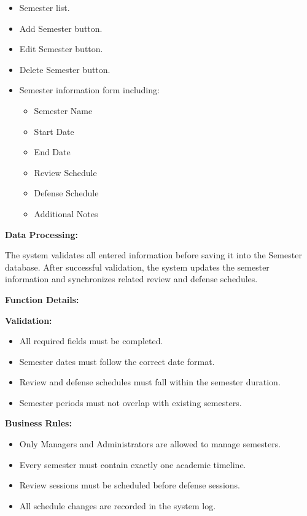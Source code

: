 \begin{itemize}
    \item Semester list.
    \item Add Semester button.
    \item Edit Semester button.
    \item Delete Semester button.
    \item Semester information form including:
    \begin{itemize}
        \item Semester Name
        \item Start Date
        \item End Date
        \item Review Schedule
        \item Defense Schedule
        \item Additional Notes
    \end{itemize}
\end{itemize}

\vspace{0.2cm}

\textbf{Data Processing:}

The system validates all entered information before saving it into the Semester database. After successful validation, the system updates the semester information and synchronizes related review and defense schedules.

\vspace{0.3cm}

\textbf{Function Details:}

\textbf{Validation:}

\begin{itemize}
    \item All required fields must be completed.
    \item Semester dates must follow the correct date format.
    \item Review and defense schedules must fall within the semester duration.
    \item Semester periods must not overlap with existing semesters.
\end{itemize}

\vspace{0.2cm}

\textbf{Business Rules:}

\begin{itemize}
    \item Only Managers and Administrators are allowed to manage semesters.
    \item Every semester must contain exactly one academic timeline.
    \item Review sessions must be scheduled before defense sessions.
    \item All schedule changes are recorded in the system log.
\end{itemize}


